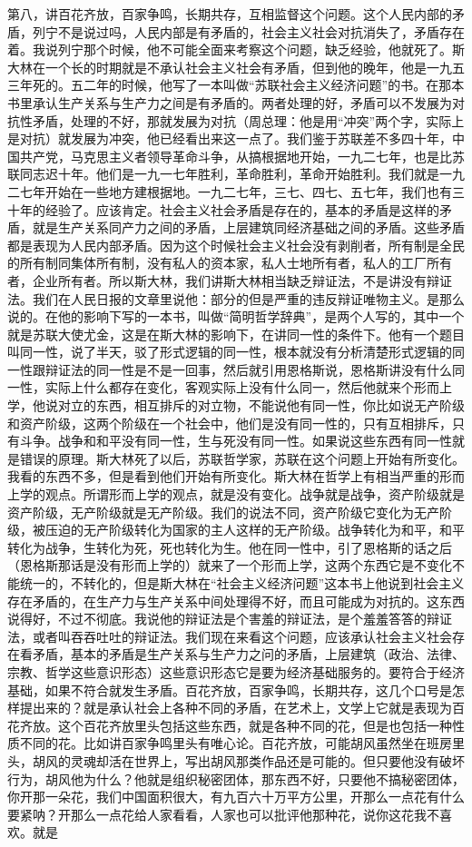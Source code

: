 第八，讲百花齐放，百家争鸣，长期共存，互相监督这个问题。这个人民内部的矛盾，列宁不是说过吗，人民内部是有矛盾的，社会主义社会对抗消失了，矛盾存在着。我说列宁那个时候，他不可能全面来考察这个问题，缺乏经验，他就死了。斯大林在一个长的时期就是不承认社会主义社会有矛盾，但到他的晚年，他是一九五三年死的。五二年的时候，他写了一本叫做“苏联社会主义经济问题”的书。在那本书里承认生产关系与生产力之间是有矛盾的。两者处理的好，矛盾可以不发展为对抗性矛盾，处理的不好，那就发展为对抗（周总理：他是用“冲突”两个字，实际上是对抗）就发展为冲突，他已经看出来这一点了。我们鉴于苏联差不多四十年，中国共产党，马克思主义者领导革命斗争，从搞根据地开始，一九二七年，也是比苏联同志迟十年。他们是一九一七年胜利，革命胜利，革命开始胜利。我们就是一九二七年开始在一些地方建根据地。一九二七年，三七、四七、五七年，我们也有三十年的经验了。应该肯定。社会主义社会矛盾是存在的，基本的矛盾是这样的矛盾，就是生产关系同产力之间的矛盾，上层建筑同经济基础之间的矛盾。这些矛盾都是表现为人民内部矛盾。因为这个时候社会主义社会没有剥削者，所有制是全民的所有制同集体所有制，没有私人的资本家，私人士地所有者，私人的工厂所有者，企业所有者。所以斯大林，我们讲斯大林相当缺乏辩证法，不是讲没有辩证法。我们在人民日报的文章里说他：部分的但是严重的违反辩证唯物主义。是那么说的。在他的影响下写的一本书，叫做“简明哲学辞典”，是两个人写的，其中一个就是苏联大使尤金，这是在斯大林的影响下，在讲同一性的条件下。他有一个题目叫同一性，说了半天，驳了形式逻辑的同一性，根本就没有分析清楚形式逻辑的同一性跟辩证法的同一性是不是一回事，然后就引用恩格斯说，恩格斯讲没有什么同一性，实际上什么都存在变化，客观实际上没有什么同一，然后他就来个形而上学，他说对立的东西，相互排斥的对立物，不能说他有同一性，你比如说无产阶级和资产阶级，这两个阶级在一个社会中，他们是没有同一性的，只有互相排斥，只有斗争。战争和和平没有同一性，生与死没有同一性。如果说这些东西有同一性就是错误的原理。斯大林死了以后，苏联哲学家，苏联在这个问题上开始有所变化。我看的东西不多，但是看到他们开始有所变化。斯大林在哲学上有相当严重的形而上学的观点。所谓形而上学的观点，就是没有变化。战争就是战争，资产阶级就是资产阶级，无产阶级就是无产阶级。我们的说法不同，资产阶级它变化为无产阶级，被压迫的无产阶级转化为国家的主人这样的无产阶级。战争转化为和平，和平转化为战争，生转化为死，死也转化为生。他在同一性中，引了恩格斯的话之后（恩格斯那话是没有形而上学的）就来了一个形而上学，这两个东西它是不变化不能统一的，不转化的，但是斯大林在“社会主义经济问题”这本书上他说到社会主义存在矛盾的，在生产力与生产关系中间处理得不好，而且可能成为对抗的。这东西说得好，不过不彻底。我说他的辩证法是个害羞的辩证法，是个羞羞答答的辩证法，或者叫吞吞吐吐的辩证法。我们现在来看这个问题，应该承认社会主义社会存在看矛盾，基本的矛盾是生产关系与生产力之问的矛盾，上层建筑（政治、法律、宗教、哲学这些意识形态）这些意识形态它是要为经济基础服务的。要符合于经济基础，如果不符合就发生矛盾。百花齐放，百家争鸣，长期共存，这几个口号是怎样提出来的？就是承认社会上各种不同的矛盾，在艺术上，文学上它就是表现为百花齐放。这个百花齐放里头包括这些东西，就是各种不同的花，但是也包括一种性质不同的花。比如讲百家争鸣里头有唯心论。百花齐放，可能胡风虽然坐在班房里头，胡风的灵魂却活在世界上，写出胡风那类作品还是可能的。但只要他没有破坏行为，胡风他为什么？他就是组织秘密团体，那东西不好，只要他不搞秘密团体，你开那一朵花，我们中国面积很大，有九百六十万平方公里，开那么一点花有什么要紧呐？开那么一点花给人家看看，人家也可以批评他那种花，说你这花我不喜欢。就是